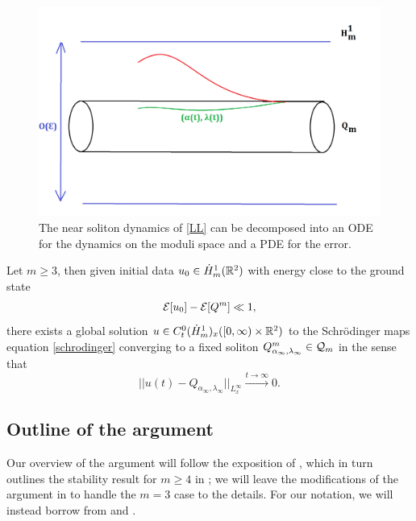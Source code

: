 \begin{figure}[h]
	\begin{center}
		\includegraphics[scale=0.25]{graphics/moduli.png}
	\caption{The near soliton dynamics of \eqref{LL} can be decomposed into an ODE for the dynamics on the moduli space and a PDE for the error. }
\end{center}
\end{figure}

\begin{theorem}\label{thm:main}
	Let $m \geq 3$, then given initial data $u_0 \in \dot H^1_m (\mathbb R^2)$ with energy close to the ground state 
		\[
			\mathcal E[u_0] - \mathcal E[Q^m] \ll 1, 
		\]
	there exists a global solution $u \in C^0_t (\dot H^1_m)_x ([0, \infty) \times \mathbb R^2)$ to the Schr\"odinger maps equation \eqref{schrodinger} converging to a fixed soliton $Q^m_{\alpha_\infty, \lambda_\infty} \in \mathcal Q_m$ in the sense that 
		\begin{equation}\label{eq:convergence}
			|| u (t) - Q_{\alpha_\infty, \lambda_\infty}||_{L^\infty_x} \overset{t \to \infty}{\longrightarrow} 0. 
		\end{equation}
\end{theorem}

\subsection{Outline of the argument}

Our overview of the argument will follow the exposition of \cite{MR2528734}, which in turn outlines the stability result for $m \geq 4$ in \cite{gustafson2007schrodinger}; we will leave the modifications of the argument in \cite{GustafsonEtAl2010} to handle the $m = 3$ case to the details. For our notation, we will instead borrow from \cite[Geometric Wave Equations]{KochEtAl2014} and \cite{BejenaruTataru2014,bejenaru2024near}. 

